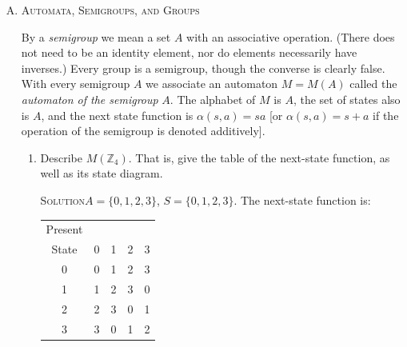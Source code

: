 \documentclass[twoside]{amsart}
\newcommand{\solution}{\textsc{Solution}\xspace}
\begin{document}
\begin{enumerate}[A.]
\begin{enumerate}[1]
\begin{enumerate}[(a)]
	 \item How many \emph{distinct} transition functions are there
	 for the machine of part 3?

	 \solution The number of distinct machines is 5. The defining 
	 characteristic is the sum of the input sequence $\mathbf{x}$
	 modulo 5. Each sum (0, 1, 2, 3, 4) generates a distinct 
	 transition function. For example, if the sum is 0, then
	 the transition function is the identity function: $T_x(s_i)=s_i$.
	 If the sum is 2, then the transition function is increment by
	 2 (modulo 5): $T_x(s_i) = s_{i+2}$.

      \end{enumerate}

   \end{enumerate}

   \item \textsc{Automata, Semigroups, and Groups}

   By a \emph{semigroup} we mean a set $A$ with an associative operation.
   (There does not need to be an identity element, nor do elements
   necessarily have inverses.) Every group is a semigroup,
   though the converse is clearly false. With every semigroup $A$
   we associate an automaton $M=M(A)$ called the 
   \emph{automaton of the semigroup} $A$. The alphabet of $M$ is $A$,
   the set of states also is $A$, and the next state function is
   $\alpha(s,a)=sa$ [or $\alpha(s,a)=s+a$ if the operation of the semigroup
   is denoted additively].

   \begin{enumerate}[1]
      \item Describe $M(\mathbb{Z}_4)$. That is, give the table of the 
      next-state function, as well as its state diagram.
      
      \solution $A=\{0,1,2,3\}$, $S=\{0,1,2,3\}$. The next-state
      function is:
      \begin{center}
      \begin{tabular}{c|cccc}
          Present \\
	  State &  0  &  1  &  2  &  3 \\ \hline
	    0   &  0  &  1  &  2  &  3 \\
	    1   &  1  &  2  &  3  &  0 \\
	    2   &  2  &  3  &  0  &  1 \\
	    3   &  3  &  0  &  1  &  2
      \end{tabular}
      \end{center}


\end{enumerate}
\end{enumerate}
\end{document}
